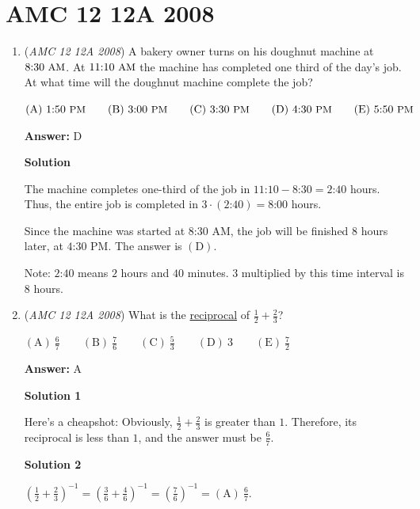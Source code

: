 \section{AMC 12 12A 2008}
        \begin{enumerate}
        	\item (\textit{AMC 12 12A 2008}) A bakery owner turns on his doughnut machine at $\text{8:30}\ {\small\text{AM}}$. At $\text{11:10}\ {\small\text{AM}}$ the machine has completed one third of the day's job. At what time will the doughnut machine complete the job?


 $\mathrm{(A)}\ \text{1:50}\ {\small\text{PM}}\qquad\mathrm{(B)}\ \text{3:00}\ {\small\text{PM}}\qquad\mathrm{(C)}\ \text{3:30}\ {\small\text{PM}}\qquad\mathrm{(D)}\ \text{4:30}\ {\small\text{PM}}\qquad\mathrm{(E)}\ \text{5:50}\ {\small\text{PM}}$

 \textbf{Answer: }D



\textbf{Solution}

The machine completes one-third of the job in $\text{11:10}-\text{8:30}=\text{2:40}$ hours. Thus, the entire job is completed in $3\cdot(\text{2:40})=\text{8:00}$ hours.

 Since the machine was started at $\text{8:30 AM}$, the job will be finished $8$ hours later, at $\text{4:30 PM}$. The answer is $\mathrm{(D)}$.

 Note: $\text{2:40}$ means $2$ hours and $40$ minutes. $3$ multiplied by this time interval is $8$ hours.

 


	\item (\textit{AMC 12 12A 2008}) What is the \href{https://artofproblemsolving.com/wiki/index.php?title=Reciprocal}{reciprocal} of $\frac{1}{2}+\frac{2}{3}$?


 $\mathrm{(A)}\ \frac{6}{7}\qquad\mathrm{(B)}\ \frac{7}{6}\qquad\mathrm{(C)}\ \frac{5}{3}\qquad\mathrm{(D)}\ 3\qquad\mathrm{(E)}\ \frac{7}{2}$

 \textbf{Answer: }A



\textbf{Solution 1}

Here's a cheapshot: Obviously, $\frac{1}{2}+\frac{2}{3}$ is greater than $1$. Therefore, its reciprocal is less than $1$, and the answer must be $\boxed{\frac{6}{7}}$.

 



\textbf{Solution 2}

$\left(\frac{1}{2}+\frac{2}{3}\right)^{-1}=\left(\frac{3}{6}+\frac{4}{6}\right)^{-1}=\left(\frac{7}{6}\right)^{-1}=\boxed{\mathrm{(A)}\ \frac{6}{7}}$.


\end{enumerate}
